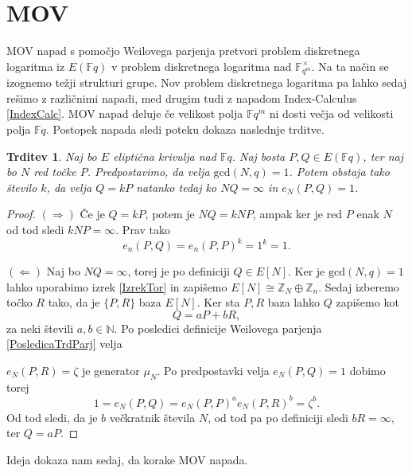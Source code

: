 \documentclass[12pt,a4paper,twoside]{article}
\theoremstyle{definition} %
\theoremstyle{plain} %
\newtheorem{trditev}[definicija]{Trditev}
\numberwithin{equation}{section}  %
\newcommand{\N}{\mathbb N}
\newcommand{\Z}{\mathbb Z}
\newcommand{\F}{\mathbb F}
\begin{document}
\section{MOV}
MOV napad s pomočjo Weilovega parjenja pretvori problem diskretnega logaritma iz $E(\F{q})$ v problem diskretnega logaritma nad $\F^{\times}_{q^m}$. Na ta način se izognemo težji strukturi grupe. Nov problem diskretnega logaritma pa lahko sedaj rešimo z različnimi napadi, med drugim tudi z napadom Index-Calculus \ref{IndexCalc}. MOV napad deluje če velikost polja $\F{q^m}$ ni dosti večja od velikosti polja $\F{q}$. Postopek napada sledi poteku dokaza naslednje trditve.

\begin{trditev}
\label{trd:5.1}
Naj bo $E$ eliptična krivulja nad $\F{q}$. Naj bosta $P,Q \in E(\F{q})$, ter naj bo $N$ red točke $P$. Predpostavimo, da velja $\text{gcd}(N,q)=1$. Potem obstaja tako število $k$, da velja $Q = kP$ natanko tedaj ko $NQ = \infty$ in $e_N(P,Q)=1$.
\end{trditev}

\begin{proof}
$(\Rightarrow)$ Če je $Q = kP$, potem je $NQ = kNP$, ampak ker je red $P$ enak $N$ od tod sledi $kNP = \infty$. Prav tako
$$e_n(P,Q) = e_n(P,P)^k = 1^k = 1.$$

$(\Leftarrow)$ Naj bo $NQ = \infty$, torej je po definiciji $Q \in E[N]$. Ker je $\text{gcd}(N,q) = 1$ lahko uporabimo izrek \ref{IzrekTor} in zapišemo 
$E[N] \cong \Z_N \oplus \Z_n$. Sedaj izberemo točko $R$ tako, da je $\{P,R \}$ baza $E[N]$. Ker sta $P,R$ baza  lahko $Q$ zapišemo kot
$$Q = aP+bR,$$
za neki števili $a,b \in \N$. Po posledici definicije Weilovega parjenja \ref{PosledicaTrdParj} velja 

\noindent $e_N(P,R)=\zeta$ je generator $\mu_N$.
Po predpostavki velja $e_N(P,Q) = 1$ dobimo torej
$$1 = e_N(P,Q) = e_N(P,P)^ae_N(P,R)^b = \zeta^b.$$
Od tod sledi, da je $b$ večkratnik števila $N$, od tod pa po definiciji sledi $bR = \infty$, ter $Q = aP$.
\end{proof}

Ideja dokaza nam sedaj, da korake MOV napada.
\end{document}
